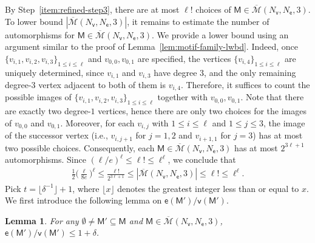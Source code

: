 \documentclass[letterpaper,11pt]{article}
\newtheorem{lemma}{Lemma}
\theoremstyle{definition}
\newcommand{\maM}{\mathcal{M}}
\newcommand{\en}{\mathsf{{e}}}
\newcommand{\vn}{\mathsf{{v}}}
\newcommand{\sfM}{{\mathsf{M}}}
\newcommand{\sfe}{{\mathsf{e}}}
\newcommand{\sfv}{{\mathsf{v}}}
\begin{document}
By Step~\ref{item:refined-step3}, there are at most $\ell!$ choices of $\sfM\in \overline{\maM}(N_\sfv,N_\sfe,3)$. To lower bound $|\overline{\maM}(N_\sfv,N_\sfe,3)|$, it remains to estimate the number of automorphisms for $\sfM\in \overline{\maM}(N_\sfv,N_\sfe,3)$. We provide a lower bound using an argument similar to the proof of Lemma~\ref{lem:motif-family-lwbd}. 
Indeed, once $\{v_{i,1},v_{i,2},v_{i,3}\}_{1\le i\le \ell}$ and $v_{0,0},v_{0,1}$ are specified, the vertices $\{v_{i,4}\}_{1\le i\le \ell}$ are uniquely determined, since $v_{i,1}$ and $v_{i,3}$ have degree $3$, and the only remaining degree-$3$ vertex adjacent to both of them is $v_{i,4}$. Therefore, it suffices to count the possible images of $\{v_{i,1},v_{i,2},v_{i,3}\}_{1\le i\le \ell}$ together with $v_{0,0},v_{0,1}$. Note that there are exactly two degree-$1$ vertices, hence there are only two choices for the images of $v_{0,0}$ and $v_{0,1}$. Moreover, for each $v_{i,j}$ with $1\le i\le \ell$ and $1\le j\le 3$, the image of the successor vertex (i.e., $v_{i,j+1}$ for $j=1,2$ and $v_{i+1,1}$ for $j=3$) has at most two possible choices. Consequently, each $\sfM\in\overline{\maM}(N_\sfv,N_\sfe,3)$ has at most $2^{3\ell+1}$ automorphisms. Since $(\ell/e)^{\ell}\le \ell!\le \ell^\ell$, we conclude that
\begin{align}\label{eq:refined-construct}
    \frac{1}{2}\Big(\frac{\ell}{8e}\Big)^{\ell}\le \frac{\ell!}{2^{3\ell+1}}\le |\overline{\maM}(N_\sfv,N_\sfe,3)|\le \ell!\le \ell^\ell.
\end{align}
Pick $t=\lfloor \delta^{-1}\rfloor+1$, where $\lfloor x\rfloor$ denotes the greatest integer less than or equal to $x$. We first introduce the following lemma on $\en(\sfM')/\vn(\sfM')$.
\begin{lemma}\label{lem:refined-aut-lwbd}
    For any $\emptyset\neq \sfM'\subseteq \sfM$ and $\sfM\in \overline{\maM}(N_\sfv,N_\sfe,3)$,  $\en(\sfM')/\vn(\sfM')\le 1+\delta$.
\end{lemma}
\end{document}
